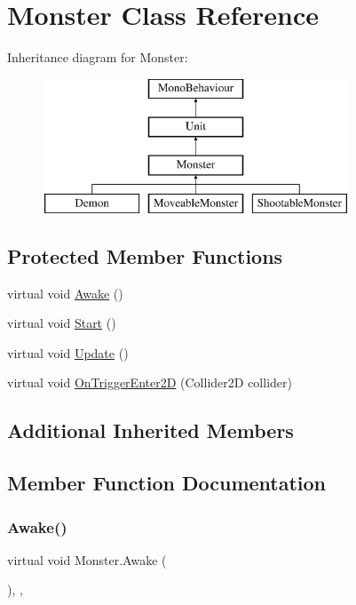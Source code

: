 \hypertarget{class_monster}{}\section{Monster Class Reference}
\label{class_monster}
Inheritance diagram for Monster\+:\begin{figure}[H]
\begin{center}
\leavevmode
\includegraphics[height=4.000000cm]{class_monster}
\end{center}
\end{figure}
\subsection*{Protected Member Functions}
\begin{DoxyCompactItemize}
\item 
virtual void \mbox{\hyperlink{class_monster_a3ccbdc33e8e7e6fb20286338ad17c6f2}{Awake}} ()
\item 
virtual void \mbox{\hyperlink{class_monster_a79f369a560bdcf5b3dfaf8c9382582d8}{Start}} ()
\item 
virtual void \mbox{\hyperlink{class_monster_a91c04bb8ad53b26283de5f5bab20b789}{Update}} ()
\item 
virtual void \mbox{\hyperlink{class_monster_af6ac6a4c01088e6b4abf79da772cecff}{On\+Trigger\+Enter2D}} (Collider2D collider)
\end{DoxyCompactItemize}
\subsection*{Additional Inherited Members}


\subsection{Member Function Documentation}
\mbox{\label{class_monster_a3ccbdc33e8e7e6fb20286338ad17c6f2}} 
\subsubsection{\texorpdfstring{Awake()}{Awake()}}
{\footnotesize\ttfamily virtual void Monster.\+Awake (\begin{DoxyParamCaption}{ }\end{DoxyParamCaption})\hspace{0.3cm}{\ttfamily [inline]}, {\ttfamily [protected]}, {\ttfamily [virtual]}}



